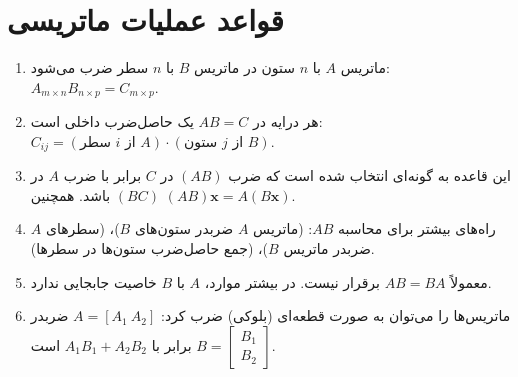 \documentclass[12pt, a4paper]{book}
\begin{document}
	
	\onehalfspacing
	
	\section{قواعد عملیات ماتریسی}
	
	\begin{enumerate}
		\item ماتریس $A$ با $n$ ستون در ماتریس $B$ با $n$ سطر ضرب می‌شود: $A_{m \times n} B_{n \times p} = C_{m \times p}$.
		\item هر درایه در $AB=C$ یک حاصل‌ضرب داخلی است: $C_{ij} = (\text{سطر } i \text{ از } A) \cdot (\text{ستون } j \text{ از } B)$.
		\item این قاعده به گونه‌ای انتخاب شده است که ضرب $(AB)$ در $C$ برابر با ضرب $A$ در $(BC)$ باشد. همچنین $(AB)\mathbf{x} = A(B\mathbf{x})$.
		\item راه‌های بیشتر برای محاسبه $AB$: (ماتریس $A$ ضربدر ستون‌های $B$)، (سطرهای $A$ ضربدر ماتریس $B$)، (جمع حاصل‌ضرب ستون‌ها در سطرها).
		\item معمولاً $AB = BA$ برقرار نیست. در بیشتر موارد، $A$ با $B$ خاصیت جابجایی ندارد.
		\item ماتریس‌ها را می‌توان به صورت قطعه‌ای (بلوکی) ضرب کرد: $A = [A_1 \ A_2]$ ضربدر $B = \begin{bmatrix} B_1 \\ B_2 \end{bmatrix}$ برابر با $A_1B_1 + A_2B_2$ است.
	\end{enumerate}
	
\end{document}

